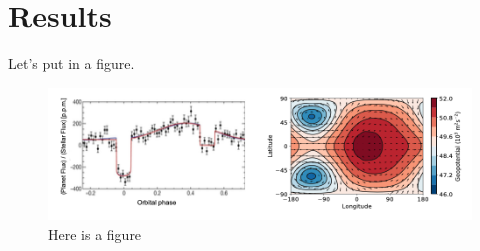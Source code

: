 \section{Results}
\label{ch2:results}


Let's put in a figure.

\begin{figure}[h]
    \centering
    \includegraphics[width=\textwidth]{figures/random-figure.png}
    \caption{Here is a figure \parencite{Elliott2016}}
    \label{fig:ch2-rand}
\end{figure}

\lipsum[2]